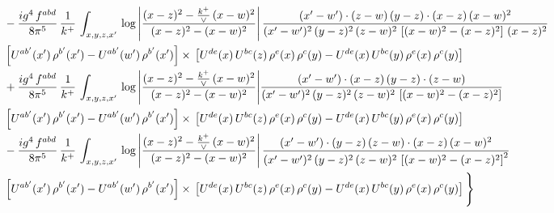 \documentclass[9pt]{article}
\numberwithin{equation}{section}
\begin{document}
\begin{align}
& - \frac{ig^{4}\, f^{abd}}{8\pi^{5}}\, \frac{1}{k^{+}}\, \int_{x,y,z,x'}\,\log{\left|\frac{(x-z)^{2}-\frac{k^{+}}{\vee}\,(x-w)^{2}}{(x-z)^{2}-(x-w)^{2}}\right|}\,\frac{(x'-w')\cdot (z-w)\, (y-z)\cdot (x-z)\, (x-w)^{2}}{(x'-w')^{2}\, (y-z)^{2}\, (z-w)^{2}\,\left[(x-w)^{2} - (x-z)^{2}\right]\, (x-z)^{2}}\, \notag \\ & \left[U^{ab'}(x')\,\rho^{b'}(x')-U^{ab'}(w')\, \rho^{b'}(x')\right]\times\,\left[U^{de}(x)\,U^{bc}(z)\, \rho^{e}(x)\,\rho^{c}(y)-U^{de}(x)\,U^{bc}(y)\,\rho^{e}(x)\,\rho^{c}(y)\right] \notag \\
& +\frac{ig^{4}\, f^{abd}}{8\pi^{5}}\, \frac{1}{k^{+}}\, \int_{x,y,z,x'}\,\log{\left|\frac{(x-z)^{2}-\frac{k^{+}}{\vee}\,(x-w)^{2}}{(x-z)^{2}-(x-w)^{2}}\right|}\frac{(x'-w')\cdot (x-z)\, (y-z)\cdot (z-w)}{(x'-w')^{2}\, (y-z)^{2}\, (z-w)^{2}\,\left[(x-w)^{2} -(x-z)^{2}\right]}\, \notag \\ & \left[U^{ab'}(x')\,\rho^{b'}(x')-U^{ab'}(w')\, \rho^{b'}(x')\right]\times\,\left[U^{de}(x)\,U^{bc}(z)\, \rho^{e}(x)\,\rho^{c}(y)-U^{de}(x)\,U^{bc}(y)\,\rho^{e}(x)\,\rho^{c}(y)\right] \notag \\
& -\frac{ig^{4}\, f^{abd}}{8\pi^{5}}\, \frac{1}{k^{+}}\, \int_{x,y,z,x'}\,\log{\left|\frac{(x-z)^{2}-\frac{k^{+}}{\vee}\,(x-w)^{2}}{(x-z)^{2}-(x-w)^{2}}\right|}\,\frac{(x'-w')\cdot (y-z)\, (z-w)\cdot (x-z)\,(x-w)^{2}}{(x'-w')^{2}\, (y-z)^{2}\, (z-w)^{2}\,\left[(x-w)^{2}-(x-z)^{2}\right]^{2}}\, \notag \\ & \left[U^{ab'}(x')\,\rho^{b'}(x')-U^{ab'}(w')\, \rho^{b'}(x')\right]\times\,\left[U^{de}(x)\,U^{bc}(z)\, \rho^{e}(x)\,\rho^{c}(y)-U^{de}(x)\,U^{bc}(y)\,\rho^{e}(x)\,\rho^{c}(y)\right]\Bigg\}
\end{align}
\end{document}
